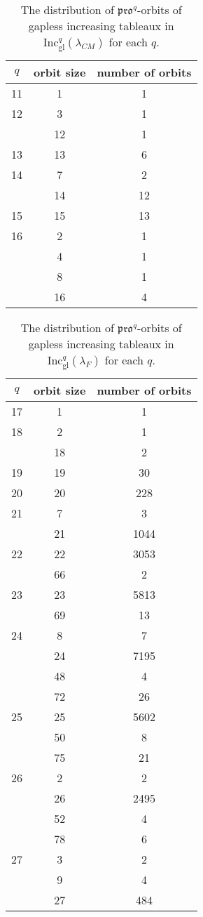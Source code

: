 \documentclass[12pt]{amsart}
\theoremstyle{definition}
\theoremstyle{remark}
\numberwithin{equation}{section}
\newcommand{\inc}{\ensuremath{\mathrm{Inc}}}
\newcommand{\incgl}{\inc_{\mathrm{gl}}}
\newcommand{\pro}{\mathfrak{pro}}
\begin{document}
\begin{table}[h]
\begin{tabular}{|c|c|c|}
\hline
$q$ & orbit size & number of orbits\\
  \hline
  11 & 1 & 1\\
  \hline
  12 & 3 & 1\\ \cline{2-3}
   & 12 & 1 \\
   \hline
  13 & 13 & 6\\
  \hline
  14 & 7 & 2\\\cline{2-3}
  & 14 & 12\\
  \hline
    15 & 15 & 13\\
  \hline
  16 & 2 & 1\\\cline{2-3}
   & 4 & 1\\\cline{2-3}
   & 8 & 1\\\cline{2-3}
  & 16 & 4\\
  \hline
\end{tabular}
\caption{The distribution of $\pro^q$-orbits of gapless increasing tableaux in $\incgl^q(\lambda_{CM})$ for each $q$.}
\label{tab:E6}
\end{table}

\begin{table}[h]
\begin{tabular}{|c|c|c|}
\hline
$q$ & orbit size & number of orbits\\
  \hline
  17 & 1 & 1\\
  \hline
  18 & 2 & 1\\ \cline{2-3}
   & 18 & 2 \\
   \hline
  19 & 19 & 30\\
  \hline
  20 & 20 & 228\\
  \hline
    21 & 7 & 3\\ \cline{2-3}
    & 21 & 1044 \\
  \hline
  22 & 22 & 3053\\\cline{2-3}
   & 66 & 2\\
  \hline
  23 & 23 & 5813\\ \cline{2-3}
  & 69 & 13 \\
   \hline
  24 & 8 & 7\\\cline{2-3}
   & 24 & 7195\\\cline{2-3}
   & 48 & 4\\\cline{2-3}
   & 72 & 26\\
   \hline
  25 & 25 & 5602\\ \cline{2-3}
  & 50 & 8 \\ \cline{2-3}
  & 75 & 21 \\
   \hline
  26 & 2 & 2\\ \cline{2-3}
  & 26 & 2495 \\ \cline{2-3}
  & 52 & 4 \\ \cline{2-3}
  & 78 & 6 \\
   \hline
 27 & 3 & 2\\ \cline{2-3}
  & 9 & 4 \\ \cline{2-3}
  & 27 & 484 \\
  \hline
\end{tabular}
\caption{The distribution of $\pro^q$-orbits of gapless increasing tableaux in $\incgl^q(\lambda_F)$ for each $q$.}
\label{tab:E7}
\end{table}
\end{document}
